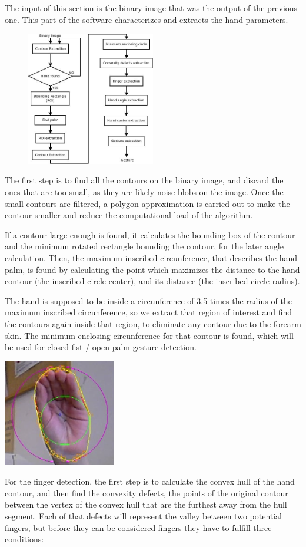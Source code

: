 The input of this section is the binary image that was the output of the previous one. This part of the software characterizes and extracts the hand parameters. 

\begin{figure}[H]
	\centering
	\includegraphics[width=0.5\textwidth]{../images/hand_description.jpeg} 
\end{figure}


The first step is to find all the contours on the binary image, and discard the ones that are too small, as they are likely noise blobs on the image. Once the small contours are filtered, a polygon approximation is carried out to make the contour smaller and reduce the computational load of the algorithm.

If a contour large enough is found, it calculates the bounding box of the contour and the minimum rotated rectangle bounding the contour, for the later angle calculation. Then, the maximum inscribed circunference, that describes the hand palm, is found by calculating the point which maximizes the distance to the hand contour (the inscribed circle center), and its distance (the inscribed circle radius).

The hand is supposed to be inside a circunference of 3.5 times the radius of the maximum inscribed circunference, so we extract that region of interest and find the contours again inside that region, to eliminate any contour due to the forearm skin. The minimum enclosing circunference for that contour is found, which will be used for closed fist / open palm gesture detection.
\begin{center}
\includegraphics[scale=1]{images/click_cropped.png} 
\end{center}
For the finger detection, the first step is to calculate the convex hull of the hand contour, and then find the convexity defects, the points of the original contour between the vertex of the convex hull that are the furthest away from the hull segment. Each of that defects will represent the valley between two potential fingers, but before they can be considered fingers they have to fulfill three conditions:

